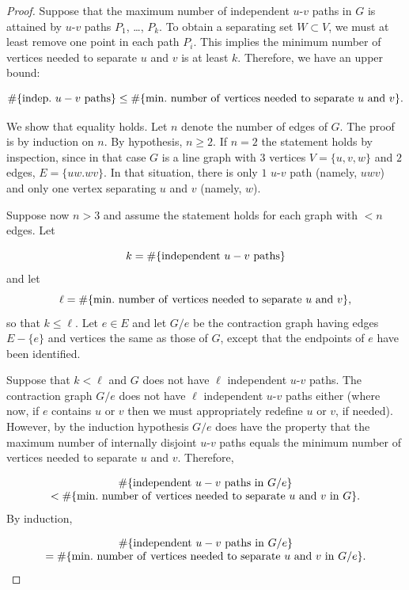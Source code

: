 \begin{proof}
Suppose that the maximum number of independent $u$-$v$ paths in
$G$ is attained by $u$-$v$ paths $P_1$, \dots, $P_k$.
To obtain a separating set $W\subset V$, we must at least remove
one point in each path $P_i$. This implies
the minimum number of vertices needed to separate $u$ and $v$
is at least $k$. Therefore, we have an upper bound:

\[
\#\{ {\rm indep.}\ u-v\ {\rm paths}\}
\leq
\# \{{\rm min.\ number \ of\ vertices\ needed\ to\ separate}\ u\
{\rm and}\  v\}.
\]

We show that equality holds. Let $n$ denote the number
of edges of $G$. The proof is by induction on $n$. By hypothesis,
$n\geq 2$.
If $n=2$ the statement holds by inspection, since in that case
$G$ is a line graph with $3$ vertices
$V=\{u,v,w\}$ and $2$ edges, $E=\{uw.wv\}$. In that situation,
there is only $1$ $u$-$v$ path
(namely, $uwv$) and only one vertex separating $u$ and $v$
(namely, $w$).

Suppose now $n>3$ and assume the statement holds for each
graph with $<n$ edges. Let

\[
k = \#\{ {\rm independent}\ u-v\ {\rm paths}\}
\]
and let
\[
\ell =
\# \{{\rm min.\ number \ of\ vertices\ needed\ to\ separate}\
u\ {\rm and}\  v\},
\]
so that $k\leq \ell$. Let $e\in E$ and let $G/e$ be the
contraction graph having edges $E-\{e\}$ and
vertices the same as those of $G$, except that
the endpoints of $e$ have been identified.

Suppose that $k<\ell$ and $G$ does not have $\ell$
independent $u$-$v$ paths. The contraction
graph $G/e$ does not have $\ell$
independent $u$-$v$ paths either (where
now, if $e$ contains $u$ or $v$ then we must
appropriately redefine $u$ or $v$, if needed).
However, by the induction hypothesis
$G/e$ does have the property that
the maximum number of internally disjoint $u$-$v$ paths
equals the minimum number of vertices needed to separate $u$ and $v$.
Therefore,

\[
\begin{array}{c}
\#\{ {\rm independent}\ u-v\ {\rm paths\ in}\ G/e\}\\
<
\# \{{\rm min.\ number \ of\ vertices\ needed\ to\ separate}
\ u\ {\rm and}\  v\ {\rm in}\ G\}.
\end{array}
\]
By induction,

\[
\begin{array}{c}
\#\{ {\rm independent\ }u-v{\rm \ paths\ in\ }G/e\}\\
=
\# \{{\rm min.\ number \ of\ vertices\ needed\ to\ separate\
}u{\rm \ and}\  v\ {\rm in\ }G/e\}.
\end{array}
\]


\end{proof}
